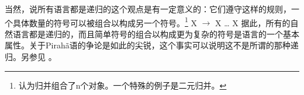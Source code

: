 	
当然，说所有语言都是递归的这个观点是有一定意义的：它们遵守这样的规则，一个具体数量的符号可以被组合以构成另一个符号。\footnote{%
 \citet[]{Chomsky2005a}认为归并组合了n个对象。一个特殊的例子是二元归并。
}
\ea
X $\to$ X \ldots{} X
\z
据此，所有的自然语言都是递归的，而且简单符号的组合以构成更为复杂的符号是语言的一个基本属性\citep[]{Hockett60a}。关于Pirah{\~a}语的争论是如此的尖锐，这个事实可以说明这不是所谓的那种递归。另参见 \citet{Fitch2010a}。

